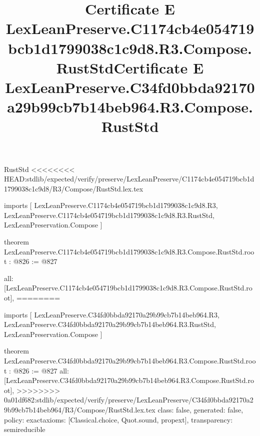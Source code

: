 \begin{lexlean}{RustStd}
<<<<<<<< HEAD:stdlib/expected/verify/preserve/LexLeanPreserve/C1174cb4e054719bcb1d1799038c1c9d8/R3/Compose/RustStd.lex.tex
\title{Certificate E LexLeanPreserve.C1174cb4e054719bcb1d1799038c1c9d8.R3.Compose.RustStd}
\begin{coremodule}
imports [
  LexLeanPreserve.C1174cb4e054719bcb1d1799038c1c9d8.R3,
  LexLeanPreserve.C1174cb4e054719bcb1d1799038c1c9d8.R3.RustStd,
  LexLeanPreservation.Compose
]

theorem LexLeanPreserve.C1174cb4e054719bcb1d1799038c1c9d8.R3.Compose.RustStd.root : @826 := @827 {
  all: [LexLeanPreserve.C1174cb4e054719bcb1d1799038c1c9d8.R3.Compose.RustStd.root],
========
\title{Certificate E LexLeanPreserve.C34fd0bbda92170a29b99cb7b14beb964.R3.Compose.RustStd}
\begin{coremodule}
imports [
  LexLeanPreserve.C34fd0bbda92170a29b99cb7b14beb964.R3,
  LexLeanPreserve.C34fd0bbda92170a29b99cb7b14beb964.R3.RustStd,
  LexLeanPreservation.Compose
]

theorem LexLeanPreserve.C34fd0bbda92170a29b99cb7b14beb964.R3.Compose.RustStd.root : @826 := @827 {
  all: [LexLeanPreserve.C34fd0bbda92170a29b99cb7b14beb964.R3.Compose.RustStd.root],
>>>>>>>> 0a01df682:stdlib/expected/verify/preserve/LexLeanPreserve/C34fd0bbda92170a29b99cb7b14beb964/R3/Compose/RustStd.lex.tex
  class: false,
  generated: false,
  policy: exact{axioms: [Classical.choice, Quot.sound, propext]},
  transparency: semireducible
}


\end{coremodule}}
\end{coremodule}
\end{lexlean}
